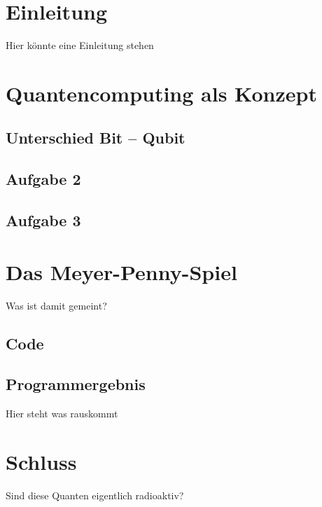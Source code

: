 \chapter{Einleitung}
Hier könnte eine Einleitung stehen

\chapter{Quantencomputing als Konzept}
\section{Unterschied Bit -- Qubit}

\section{Aufgabe 2}
\section{Aufgabe 3}


\chapter{Das Meyer-Penny-Spiel}
Was ist damit gemeint?

\section{Code}

\section{Programmergebnis}
Hier steht was rauskommt

\chapter{Schluss}
Sind diese Quanten eigentlich radioaktiv?